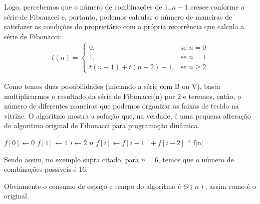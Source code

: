 \begin{figure}[!h]
\label{fig:6.21-1}
\end{figure}

Logo, percebemos que o número de combinações de $1..n-1$ cresce conforme a série de Fibonacci e, portanto, podemos calcular o número de maneiras de satisfazer as condições do proprietário com a própria recorrência que calcula a série de Fibonacci:
\begin{align*}
t(n) = \left\{\begin{array}{rl}
                    0, &\mbox{se $n = 0$} \\
                    1, &\mbox{se $n = 1$} \\
                    t(n - 1) + t(n - 2) + 1, &\mbox{se $n \geq 2$}
                \end{array} \right.
\end{align*}

Como temos duas possibilidades (iniciando a série com B ou V), basta multiplicarmos o resultado da série de Fibonacci(n) por 2 e teremos, então, o número de diferentes maneiras que podemos organizar as faixas de tecido na vitrine. O algoritmo  mostra a solução que, na verdade, é uma pequena alteração do algoritmo original de Fibonacci para programação dinâmica.

\begin{codebox}
\li $f[0] \gets 0$
\li $f[1] \gets 1$
\li \For $i \gets 2$ \To $n$
\li \Do
        $f[i] \gets f[i-1] + f[i-2]$
    \End
\li {} * f[n]
\end{codebox}

Sendo assim, no exemplo supra citado, para $n = 6$, temos que o número de combinações possíveis é 16.

Obviamente o consumo de espaço e tempo do algoritmo é $\Theta(n)$, assim como é o original.\\[12pt]
